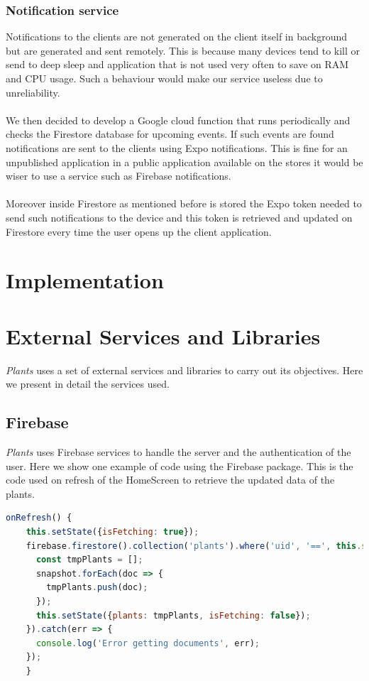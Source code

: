 \documentclass[10pt]{article}
\begin{document}
	\subsubsection{Notification service}
	Notifications to the clients are not generated on the client itself in background but are generated and sent remotely. This is because many devices tend to kill or send to deep sleep and application that is not used very often to save on RAM and CPU usage. Such a behaviour would make our service useless due to unreliability. \\\\ We then decided to develop a Google cloud function that runs periodically and checks the Firestore database for upcoming events. If such events are found notifications are sent to the clients using Expo notifications. This is fine for an unpublished application in a public application available on the stores it would be wiser to use a service such as Firebase notifications.\\\\ Moreover inside Firestore as mentioned before is stored the Expo token needed to send such notifications to the device and this token is retrieved and updated on Firestore every time the user opens up the client application.
	
	\section{Implementation}
	
	\section{External Services and Libraries}
	\textit{Plants} uses a set of external services and libraries to carry out its objectives. Here we present in detail the services used.
	
	\subsection{Firebase}
	\textit{Plants} uses Firebase services to handle the server and the authentication of the user. Here we show one example of code using the Firebase package. This is the code used on refresh of the HomeScreen to retrieve the updated data of the plants.
	\begin{lstlisting}[language=JavaScript]
    onRefresh() {
    this.setState({isFetching: true});
    firebase.firestore().collection('plants').where('uid', '==', this.state.user.uid).get().then(snapshot => {
      const tmpPlants = [];
      snapshot.forEach(doc => {
        tmpPlants.push(doc);
      });
      this.setState({plants: tmpPlants, isFetching: false});
    }).catch(err => {
      console.log('Error getting documents', err);
    });
    }
	\end{lstlisting}
\end{document}
